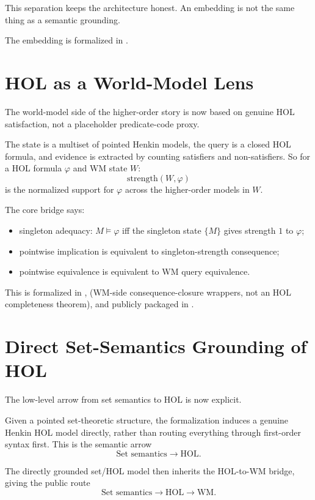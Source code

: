 \documentclass[11pt,openany]{report}
\begin{document}
This separation keeps the architecture honest.  An embedding is not the same
thing as a semantic grounding.

The embedding is formalized in
.

\section{HOL as a World-Model Lens}

The world-model side of the higher-order story is now based on genuine HOL
satisfaction, not a placeholder predicate-code proxy.

The state is a multiset of pointed Henkin models, the query is a closed HOL
formula, and evidence is extracted by counting satisfiers and non-satisfiers.
So for a HOL formula $\varphi$ and WM state $W$:
\[
  \mathrm{strength}(W,\varphi)
\]
is the normalized support for $\varphi$ across the higher-order models in
$W$.

The core bridge says:
\begin{itemize}
\item singleton adequacy: $M \models \varphi$ iff the singleton state
  $\{M\}$ gives strength $1$ to $\varphi$;
\item pointwise implication is equivalent to singleton-strength consequence;
\item pointwise equivalence is equivalent to WM query equivalence.
\end{itemize}

This is formalized in
,
(WM-side consequence-closure wrappers, not an HOL completeness theorem),
and publicly packaged in
.

\section{Direct Set-Semantics Grounding of HOL}

The low-level arrow from set semantics to HOL is now explicit.

Given a pointed set-theoretic structure, the formalization induces a genuine
Henkin HOL model directly, rather than routing everything through first-order
syntax first.  This is the semantic arrow
\[
  \text{Set semantics} \longrightarrow \text{HOL}.
\]

The directly grounded set/HOL model then inherits the HOL-to-WM bridge, giving
the public route
\[
  \text{Set semantics} \longrightarrow \text{HOL} \longrightarrow \text{WM}.
\]
\end{document}
